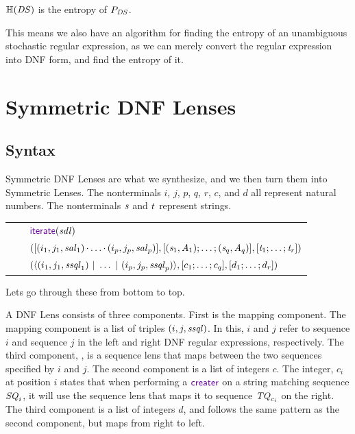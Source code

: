 \documentclass[acmsmall,screen,anonymous]{acmart}
\begin{document}
\begin{theorem}
  $\mathbb{H}(\mathit{DS})$ is the entropy of $P_{\mathit{DS}}$.
\end{theorem}

This means we also have an algorithm for finding the entropy of an unambiguous
stochastic regular expression, as we can merely convert the regular expression
into DNF form, and find the entropy of it.

\section{Symmetric DNF Lenses}
\label{sec:symmetric-dnf-lenses}
\subsection{Syntax}
Symmetric DNF Lenses are what we synthesize, and we then turn them into
Symmetric Lenses. The nonterminals $i$, $j$, $p$, $q$, $r$, $c$, and $d$ all
represent natural numbers. The nonterminals $\mathit{s}$ and $\mathit{t}$ represent
strings.

\begin{center}
  \begin{tabular}{@{}r@{\ }c@{}l@{}}
    \SAtomLens{} & \GEq{} & $\IterateLensOf{\SDNFLens}$ \\
    \SSQLens{} & \GEq{} & $([(i_1,j_1,\mathit{sal}_1)\mkern-1mu\cdot\mkern-1mu
                          \ldots\mkern-1mu\cdot\mkern-1mu
                          (i_p,j_p,\mathit{sal}_p)]
                          ,[ (\mathit{s}_1,\mathit{A}_1);\ldots;(\mathit{s}_q,\mathit{A}_q) ]
                          ,[ \mathit{t}_1;\ldots;\mathit{t}_r ])$ \\
    \SDNFLens{} & \GEq{} & $(\langle(i_1,j_1,\mathit{ssql}_1)~|~
                           \ldots~|~
                           (i_p,j_p,\mathit{ssql}_p)\rangle
                           ,[ c_1;\ldots;c_q ]
                           ,[ d_1;\ldots;d_r ])$ \\
  \end{tabular}
\end{center}

Lets go through these from bottom to top.

A DNF Lens \SDNFLens{} consists of three components. First is the mapping
component. The mapping component is a list of triples $(i,j,\mathit{ssql})$. In this,
$i$ and $j$ refer to sequence $i$ and sequence $j$ in the left and right DNF
regular expressions, respectively. The third component, \SSQLens{}, is a
sequence lens that maps between the two sequences specified by $i$ and $j$. The
second component is a list of integers $c$. The integer, $c_i$ at position $i$
states that when performing a $\CreateR$ on a string matching sequence
$\mathit{SQ}_i$, it will use the sequence lens that maps it to sequence
$\mathit{TQ}_{c_i}$ on the right. The third component is a list of integers
$d$, and follows the same pattern as the second component, but maps from right
to left.
\end{document}
